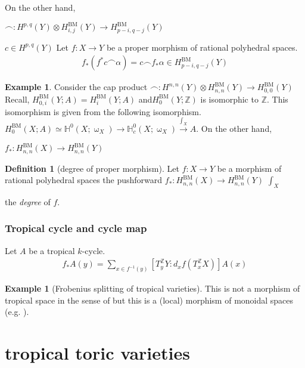 \documentclass[a4paper,dvipdfmx,reqno,12pt]{amsart}
\makeatletter
\newcommand{\ind}[2]{\emph{#1}\index{1{#2}@{#1}}}
\theoremstyle{definition}
\newtheorem{Def}[Thm]{Definition}
\newtheorem{Eg}[Thm]{Example}
\newcommand{\Z}{\mathbb{Z}}%
\newcommand{\mb}[1]{\mathbb{#1}}%
\newcommand{\opn}[1]{\operatorname{#1}}
\newcommand{\xto}[1]{\xrightarrow{#1}}
\numberwithin{equation}{section}
\makeatother
\begin{document}
On the other hand,

$\frown: H^{p,q}(Y) \otimes H_{i,j}^{\opn{BM}}(Y)\to H_{p-i,q-j}^{\opn{BM}}(Y)$

$c\in H^{p,q}(Y)$
Let $f:X\to Y$ be a proper morphism of rational polyhedral spaces.
\begin{align}
  f_*(f^{*}c\frown \alpha)=c\frown f_*\alpha\in H_{p-i,q-j}^{\opn{BM}}(Y)
\end{align}
\begin{Eg}
  Consider the cap product
  $\frown:H^{n,n}(Y)\otimes H_{n,n}^{\opn{BM}}(Y)\to H^{\opn{BM}}_{0,0}(Y)$
  Recall, $H^{\opn{BM}}_{0,i}(Y;A)=H_{i}^{\opn{BM}}(Y;A)$ and$H_{0}^{\opn{BM}}(Y;\Z)$
  is isomorphic to $\Z$. This isomorphism is given from the following isomorphism.
  $H_{0}^{\opn{BM}}(X;A)\simeq
    \mb{H}^{0}(X;\upomega_X)\to \mb{H}_c^{0}(X;\upomega_X) \xto{\int_X} A$.
  On the other hand,

  $f_*:H_{n,n}^{\opn{BM}}(X)\to H_{n,n}^{\opn{BM}}(Y)$

\end{Eg}
\begin{Def}[degree of proper morphism]
  Let $f:X\to Y$ be a morphism of rational polyhedral spaces the pushforward
  $f_*:H_{n,n}^{\opn{BM}}(X)\to H_{n,n}^{\opn{BM}}(Y)$ $\int_X$

  the \ind{degree}{degree} of $f$.
\end{Def}


\subsubsection{Tropical cycle and cycle map}

Let $A$ be a tropical $k$-cycle.
\cite[Definition 3.6]{gross2019sheaftheoretic}
\begin{align}
  f_*A(y)=\sum_{x\in f^{-1}(y)}[T^{\Z}_yY:d_xf(T^{\Z}_x X)]A(x)
\end{align}

\begin{Eg}[Frobenius splitting of tropical varieties]

  This is not a morphism of tropical space in the sense of
  \cite{gross2019sheaftheoretic} but this is a (local) morphism
  of monoidal spaces (e.g. \cite[II Definition 1.1.1]{MR3838359}).

\end{Eg}

\section{tropical toric varieties} \label{sec: toric}
\end{document}
